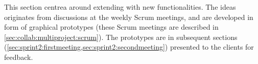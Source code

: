 This section centrea around extending \launcher with new functionalities.
The ideas originates from discussions at the weekly Scrum meetings, and are developed in form of graphical prototypes (these Scrum meetings are described in \cref{sec:collab:multiproject:scrum}).
The prototypes are in subsequent sections (\cref{sec:sprint2:firstmeeting,sec:sprint2:secondmeeting}) presented to the clients for feedback.
